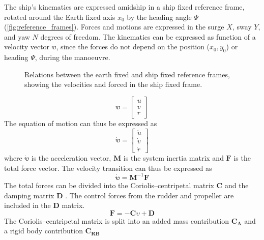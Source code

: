 The ship’s kinematics are expressed amidship in a ship fixed reference frame, rotated around the Earth fixed axis $x_0$ by the heading angle $\Psi$ (\autoref{fig:reference_frames}). Forces and motions are expressed in the surge $X$, sway $Y$, and yaw $N$ degrees of freedom. The kinematics can be expressed as function of a velocity vector $\pmb{\bm{\upsilon}}$, since the forces do not depend on the position ($x_0,y_0$) or heading $\Psi$, during the manoeuvre.
\begin{figure}[h]
    \centering
    
    \caption{Relations between the earth fixed and ship fixed reference frames, showing the velocities and forced in the ship fixed frame.}
    \label{fig:reference_frames}
\end{figure}
\begin{equation}
    \label{eq:upsilon}
    \pmb{\bm{\upsilon}} = \left[\begin{matrix}u\\v\\r\end{matrix}\right]
\end{equation}
The equation of motion can thus be expressed as
\begin{equation}
    \label{eq:upsilon1d}
    \pmb{\bm{\dot{\upsilon}}} = \left[\begin{matrix}\dot{u}\\\dot{v}\\\dot{r}\end{matrix}\right]
\end{equation}
where $\pmb{\bm{\dot{\upsilon}}}$ is the acceleration vector, $\mathbf{M}$ is the system inertia matrix and $\mathbf{F}$ is the total force vector.
The velocity transition can thus be expressed as
\begin{equation}
    \label{eq:acc}
    \pmb{\bm{\dot{\upsilon}}} = \mathbf{M}^{-1}\mathbf{F}
\end{equation}
The total forces can be divided into the Coriolis–centripetal matrix $\mathbf{C}$ and the damping matrix $\mathbf{D}$ \citep{fossenHandbookMarineCraft2011}. The control forces from the rudder and propeller are included in the $\mathbf{D}$ matrix.
\begin{equation}
    \label{eq:upsilon1d}
\mathbf{F} = - \mathbf{C} \upsilon + \mathbf{D}
\end{equation}
The Coriolis–centripetal matrix is split into an added mass contribution $\mathbf{C_A}$ and a rigid body contribution $\mathbf{C_{RB}}$

